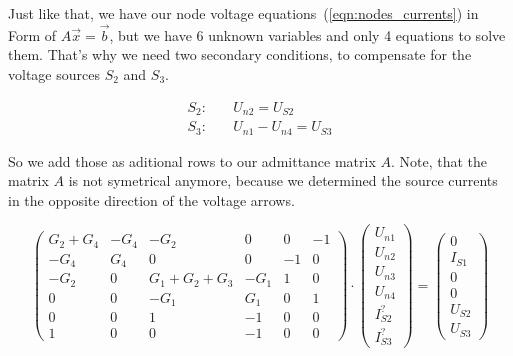 {Just like that, we have our node voltage equations \,(\ref{eqn:nodes_currents}) in Form of $A \vec{x} = \vec{b}$, but we have 6 unknown
variables and only 4 equations to solve them. That's why we need two secondary conditions, to
compensate for the voltage sources $S_2$ and $S_3$.

\begin{align*}
   S_2: \quad &U_{n2} = U_{S2} \\ 
   S_3: \quad &U_{n1} - U_{n4} = U_{S3}
\end{align*}

So we add those as aditional rows to our admittance matrix $A$. Note, that the matrix $A$ is not
symetrical anymore, because we determined the source currents in the opposite direction of the
voltage arrows. 

\begin{equation}
\begin{pmatrix}
   G_2 + G_4 & -G_4 & -G_2 & 0 & 0 & -1 \\
   -G_4 & G_4 & 0 & 0 & -1 & 0 \\
   -G_2 & 0 & G_1+G_2+G_3 & -G_1 & 1 & 0 \\
   0 & 0 & -G_1 & G_1 & 0 & 1 \\ 
   0 & 0 & 1 & -1 & 0 & 0 \\
   1 & 0 & 0 & -1 & 0 & 0 
\end{pmatrix}
\cdot
\begin{pmatrix}
   U_{n1} \\ U_{n2} \\ U_{n3} \\ U_{n4} \\ I_{S2}^? \\ I_{S3}^?
\end{pmatrix}
=
\begin{pmatrix}
   0 \\ I_{S1} \\ 0 \\ 0 \\ U_{S2} \\ U_{S3} 
\end{pmatrix}
\label{eqn:nodes_currents_src}
\end{equation}

}
